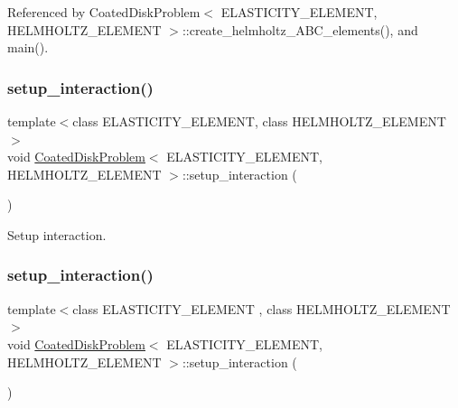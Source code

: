 Referenced by Coated\+Disk\+Problem$<$ E\+L\+A\+S\+T\+I\+C\+I\+T\+Y\+\_\+\+E\+L\+E\+M\+E\+N\+T, H\+E\+L\+M\+H\+O\+L\+T\+Z\+\_\+\+E\+L\+E\+M\+E\+N\+T $>$\+::create\+\_\+helmholtz\+\_\+\+A\+B\+C\+\_\+elements(), and main().

\mbox{\label{classCoatedDiskProblem_ad24d43389155a6a9f2f66faf4b239c26}} 
\subsubsection{\texorpdfstring{setup\+\_\+interaction()}{setup\_interaction()}\hspace{0.1cm}{\footnotesize\ttfamily [1/2]}}
{\footnotesize\ttfamily template$<$class E\+L\+A\+S\+T\+I\+C\+I\+T\+Y\+\_\+\+E\+L\+E\+M\+E\+NT, class H\+E\+L\+M\+H\+O\+L\+T\+Z\+\_\+\+E\+L\+E\+M\+E\+NT$>$ \\
void \hyperlink{classCoatedDiskProblem}{Coated\+Disk\+Problem}$<$ E\+L\+A\+S\+T\+I\+C\+I\+T\+Y\+\_\+\+E\+L\+E\+M\+E\+NT, H\+E\+L\+M\+H\+O\+L\+T\+Z\+\_\+\+E\+L\+E\+M\+E\+NT $>$\+::setup\+\_\+interaction (\begin{DoxyParamCaption}{ }\end{DoxyParamCaption})\hspace{0.3cm}{\ttfamily [private]}}



Setup interaction. 

\mbox{\label{classCoatedDiskProblem_ad24d43389155a6a9f2f66faf4b239c26}} 
\subsubsection{\texorpdfstring{setup\+\_\+interaction()}{setup\_interaction()}\hspace{0.1cm}{\footnotesize\ttfamily [2/2]}}
{\footnotesize\ttfamily template$<$class E\+L\+A\+S\+T\+I\+C\+I\+T\+Y\+\_\+\+E\+L\+E\+M\+E\+NT , class H\+E\+L\+M\+H\+O\+L\+T\+Z\+\_\+\+E\+L\+E\+M\+E\+NT $>$ \\
void \hyperlink{classCoatedDiskProblem}{Coated\+Disk\+Problem}$<$ E\+L\+A\+S\+T\+I\+C\+I\+T\+Y\+\_\+\+E\+L\+E\+M\+E\+NT, H\+E\+L\+M\+H\+O\+L\+T\+Z\+\_\+\+E\+L\+E\+M\+E\+NT $>$\+::setup\+\_\+interaction (\begin{DoxyParamCaption}{ }\end{DoxyParamCaption})\hspace{0.3cm}{\ttfamily [private]}}



